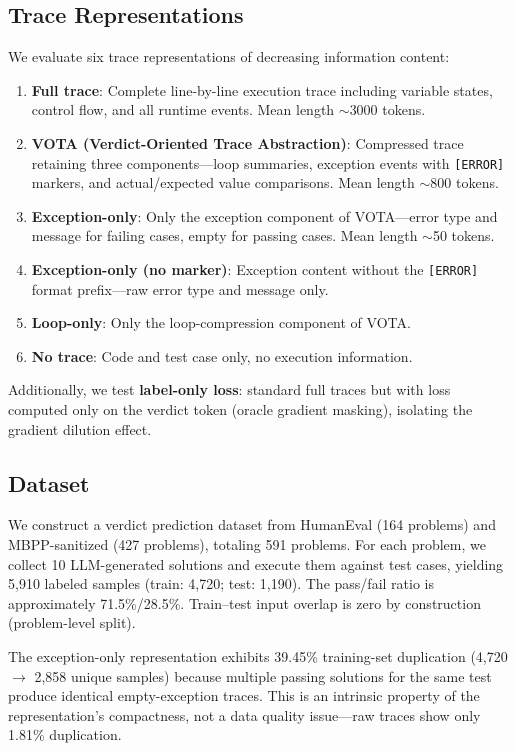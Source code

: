 \documentclass[11pt,a4paper]{article}
\begin{document}
\subsection{Trace Representations}

We evaluate six trace representations of decreasing information content:

\begin{enumerate}
\item \textbf{Full trace}: Complete line-by-line execution trace including variable states, control flow, and all runtime events. Mean length ${\sim}$3000 tokens.
\item \textbf{VOTA (Verdict-Oriented Trace Abstraction)}: Compressed trace retaining three components---loop summaries, exception events with \texttt{[ERROR]} markers, and actual/expected value comparisons. Mean length ${\sim}$800 tokens.
\item \textbf{Exception-only}: Only the exception component of VOTA---error type and message for failing cases, empty for passing cases. Mean length ${\sim}$50 tokens.
\item \textbf{Exception-only (no marker)}: Exception content without the \texttt{[ERROR]} format prefix---raw error type and message only.
\item \textbf{Loop-only}: Only the loop-compression component of VOTA.
\item \textbf{No trace}: Code and test case only, no execution information.
\end{enumerate}

Additionally, we test \textbf{label-only loss}: standard full traces but with loss computed only on the verdict token (oracle gradient masking), isolating the gradient dilution effect.

\subsection{Dataset}

We construct a verdict prediction dataset from HumanEval (164 problems) and MBPP-sanitized (427 problems), totaling 591 problems.
For each problem, we collect 10 LLM-generated solutions and execute them against test cases, yielding 5,910 labeled samples (train: 4,720; test: 1,190).
The pass/fail ratio is approximately 71.5\%/28.5\%.
Train--test input overlap is zero by construction (problem-level split).

The exception-only representation exhibits 39.45\% training-set duplication (4,720 $\to$ 2,858 unique samples) because multiple passing solutions for the same test produce identical empty-exception traces.
This is an intrinsic property of the representation's compactness, not a data quality issue---raw traces show only 1.81\% duplication.
\end{document}
